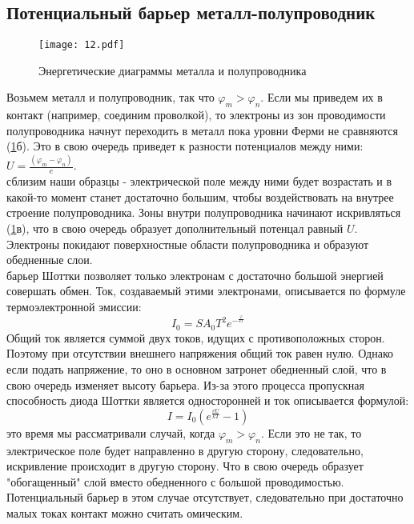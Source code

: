 \documentclass[12pt,a4paper]{article}
\begin{document}
\subsection{Потенциальный барьер металл-полупроводник}
\begin{figure}[h!]
    \centering
        \texttt{[image: 12.pdf]}
    \caption{Энергетические диаграммы металла и полупроводника}
    \label{2}
\end{figure}
Возьмем металл и полупроводник, так что $\varphi_m>\varphi_n$. Если мы приведем их в контакт (например, соединим проволкой), то электроны из зон проводимости полупроводника начнут переходить в металл пока уровни Ферми не сравняются (\ref{2}б). Это в свою очередь приведет к разности потенциалов между ними: $U=\frac{(\varphi_m-\varphi_n)}{e}$. \\
 сблизим наши образцы - электрической поле между ними будет возрастать и в какой-то момент станет достаточно большим, чтобы воздействовать на внутрее строение полупроводника. Зоны внутри полупроводника начинают искривляться (\ref{2}в), что в свою очередь образует дополнительный потенцал равный $U$. Электроны покидают поверхностные области полупроводника и образуют обедненные слои.\\
 барьер Шоттки позволяет только электронам с достаточно большой энергией совершать обмен. Ток, создаваемый этими электронами, описывается по формуле термоэлектронной эмиссии:
\begin{equation}
    I_0=SA_0T^2e^-^\frac{\varphi}{kT}
\end{equation}
Общий ток является суммой двух токов, идущих с противоположных сторон. Поэтому при отсутствии внешнего напряжения общий ток равен нулю. Однако если подать напряжение, то оно в основном затронет обедненный слой, что в свою очередь изменяет высоту барьера. Из-за этого процесса пропускная способность диода Шоттки является односторонней и ток описывается формулой:
\begin{equation}
    I=I_0(e^\frac{eU}{kT}-1)
\end{equation}
 это время мы рассматривали случай, когда $\varphi_m>\varphi_n$. Если это не так, то электрическое поле будет направленно в другую сторону, следовательно, искривление происходит в другую сторону. Что в свою очередь образует "обогащенный" слой вместо обедненного с большой проводимостью. Потенциальный барьер в этом случае отсутствует, следовательно при достаточно малых токах контакт можно считать омическим.
\end{document}
